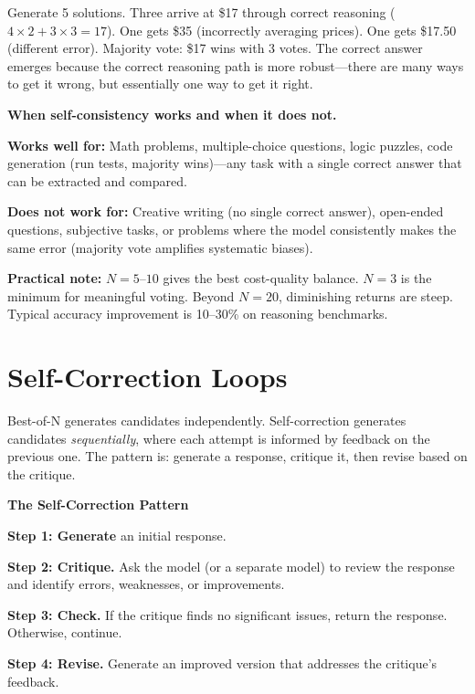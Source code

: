 \begin{chapterenv}
Generate 5 solutions. Three arrive at \$17 through correct reasoning ($4 \times 2 + 3 \times 3 = 17$). One gets \$35 (incorrectly averaging prices). One gets \$17.50 (different error). Majority vote: \$17 wins with 3 votes. The correct answer emerges because the correct reasoning path is more robust---there are many ways to get it wrong, but essentially one way to get it right.

\begin{tipbox}
\textbf{When self-consistency works and when it does not.}

\textbf{Works well for:} Math problems, multiple-choice questions, logic puzzles, code generation (run tests, majority wins)---any task with a single correct answer that can be extracted and compared.

\textbf{Does not work for:} Creative writing (no single correct answer), open-ended questions, subjective tasks, or problems where the model consistently makes the same error (majority vote amplifies systematic biases).

\textbf{Practical note:} $N = 5$--$10$ gives the best cost-quality balance. $N = 3$ is the minimum for meaningful voting. Beyond $N = 20$, diminishing returns are steep. Typical accuracy improvement is 10--30\% on reasoning benchmarks.
\end{tipbox}

\section{Self-Correction Loops}

Best-of-N generates candidates independently. Self-correction generates candidates \textit{sequentially}, where each attempt is informed by feedback on the previous one. The pattern is: generate a response, critique it, then revise based on the critique.

\begin{infobox}
\textbf{The Self-Correction Pattern}

\textbf{Step 1: Generate} an initial response.

\textbf{Step 2: Critique.} Ask the model (or a separate model) to review the response and identify errors, weaknesses, or improvements.

\textbf{Step 3: Check.} If the critique finds no significant issues, return the response. Otherwise, continue.

\textbf{Step 4: Revise.} Generate an improved version that addresses the critique's feedback.


\end{infobox}
\end{chapterenv}
